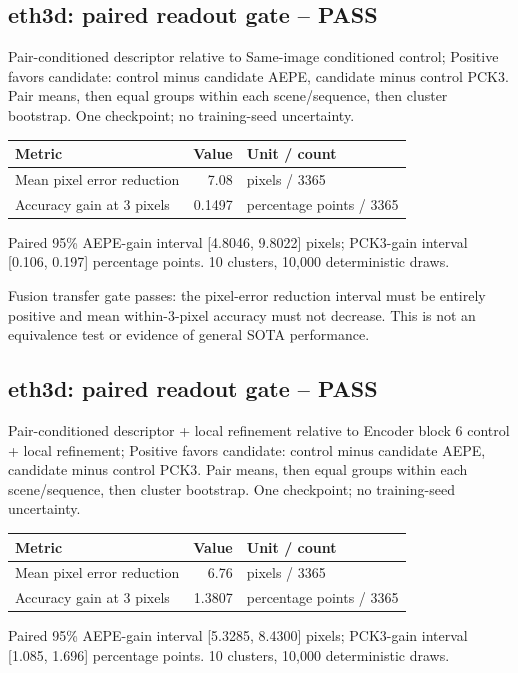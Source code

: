 \documentclass[10pt]{article}
\begin{document}
\subsection{eth3d: paired readout gate -- PASS}
Pair-conditioned descriptor relative to Same-image conditioned control; Positive favors candidate: control minus candidate AEPE, candidate minus control PCK3. Pair means, then equal groups within each scene/sequence, then cluster bootstrap. One checkpoint; no training-seed uncertainty.
\begin{center}\begin{tabular}{p{.57\linewidth}rp{.23\linewidth}}\toprule Metric & Value & Unit / count \\ \midrule
Mean pixel error reduction & 7.08 & pixels / 3365 \\
Accuracy gain at 3 pixels & 0.1497 & percentage points / 3365 \\
\bottomrule\end{tabular}\end{center}
Paired 95\% AEPE-gain interval [4.8046, 9.8022] pixels; PCK3-gain interval [0.106, 0.197] percentage points. 10 clusters, 10,000 deterministic draws.

Fusion transfer gate passes: the pixel-error reduction interval must be entirely positive and mean within-3-pixel accuracy must not decrease. This is not an equivalence test or evidence of general SOTA performance.

\subsection{eth3d: paired readout gate -- PASS}
Pair-conditioned descriptor + local refinement relative to Encoder block 6 control + local refinement; Positive favors candidate: control minus candidate AEPE, candidate minus control PCK3. Pair means, then equal groups within each scene/sequence, then cluster bootstrap. One checkpoint; no training-seed uncertainty.
\begin{center}\begin{tabular}{p{.57\linewidth}rp{.23\linewidth}}\toprule Metric & Value & Unit / count \\ \midrule
Mean pixel error reduction & 6.76 & pixels / 3365 \\
Accuracy gain at 3 pixels & 1.3807 & percentage points / 3365 \\
\bottomrule\end{tabular}\end{center}
Paired 95\% AEPE-gain interval [5.3285, 8.4300] pixels; PCK3-gain interval [1.085, 1.696] percentage points. 10 clusters, 10,000 deterministic draws.
\end{document}
